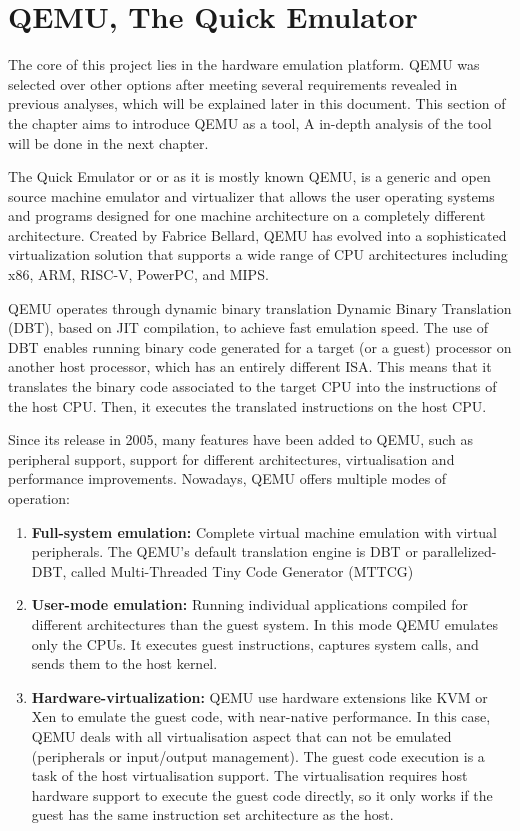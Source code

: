 \section{QEMU, The Quick Emulator}
\label{chap:Back_QEMU}

The core of this project lies in the hardware emulation platform. QEMU was 
selected over other options after meeting several requirements revealed in previous 
analyses, which will be explained later in this document. This section of the chapter 
aims to introduce QEMU as a tool, A in-depth analysis of the tool will be done in 
the next chapter.

The Quick Emulator or or as it is mostly known QEMU\cite{QemuProject}, is a generic and 
open source machine emulator and virtualizer that allows the user operating 
systems and programs designed for one machine architecture on a completely different 
architecture. Created by Fabrice Bellard\cite{WikiFabriceBellard}, QEMU has evolved into a sophisticated 
virtualization solution that supports a wide range of CPU architectures including 
x86, ARM, RISC-V, PowerPC, and MIPS. 

QEMU operates through dynamic binary translation Dynamic Binary Translation 
(DBT), based on JIT compilation, to achieve fast emulation speed. The use 
of DBT enables running binary code generated for a target (or a guest) processor 
on another host processor, which has an entirely different ISA. This means that it 
translates the binary code associated to the target CPU into the instructions of the 
host CPU. Then, it executes the translated instructions on the host CPU.

Since its release in 2005, many features have been added to QEMU, such as 
peripheral support, support for different architectures, virtualisation and performance 
improvements. Nowadays, QEMU offers multiple modes of operation:

\begin{enumerate}
  \item \textbf{Full-system emulation:} 
  Complete virtual machine emulation with virtual 
  peripherals. The QEMU's default translation engine is DBT or parallelized-DBT, 
  called Multi-Threaded Tiny Code Generator (MTTCG)

  \item \textbf{User-mode emulation:} 
  Running individual applications compiled for different 
  architectures than the guest system. In this mode QEMU emulates only 
  the CPUs. It executes guest instructions, captures system calls, and sends 
  them to the host kernel. 
  
  \item \textbf{Hardware-virtualization:} 
  QEMU use hardware extensions like KVM or Xen 
  to emulate the guest code, with near-native performance. In this case, QEMU 
  deals with all virtualisation aspect that can not be emulated (peripherals or 
  input/output management). The guest code execution is a task of the host 
  virtualisation support. The virtualisation requires host hardware support to 
  execute the guest code directly, so it only works if the guest has the same 
  instruction set architecture as the host.
\end{enumerate}


